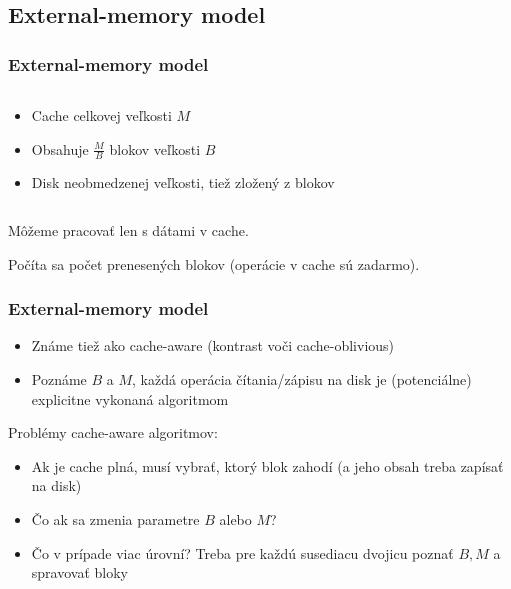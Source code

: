 \documentclass{beamer}
\begin{document}
\subsection{External-memory model}
\begin{frame}
    \frametitle{External-memory model}%
	\begin{columns}[T]
		\begin{column}{.4\textwidth}
			\begin{itemize}
				\item Cache celkovej veľkosti $M$
				\item Obsahuje $\frac{M}{B}$ blokov veľkosti $B$
				\item Disk neobmedzenej veľkosti, tiež zložený z blokov
			\end{itemize}
		\end{column}
		\begin{column}{.6\textwidth}\raggedleft
		    \resizebox{\textwidth}{!}{%
                    
            }    
		\end{column}
	\end{columns}
	\bigskip
	Môžeme pracovať len s dátami v cache.
	
    Počíta sa počet prenesených blokov (operácie v cache sú zadarmo).
    
	
\end{frame}

\begin{frame}
	\frametitle{External-memory model}
	\begin{itemize}
		\item Známe tiež ako cache-aware (kontrast voči cache-oblivious)
		\item Poznáme $B$ a $M$, každá operácia čítania/zápisu na disk je (potenciálne) explicitne vykonaná algoritmom
	\end{itemize}
    Problémy cache-aware algoritmov:
    \begin{itemize}
    		\item Ak je cache plná, musí vybrať, ktorý blok zahodí (a jeho obsah treba zapísať na disk)
            \item Čo ak sa zmenia parametre $B$ alebo $M$?
		    \item Čo v prípade viac úrovní? Treba pre každú susediacu dvojicu poznať $B, M$  a spravovať bloky
    \end{itemize}
\end{frame}
\end{document}
